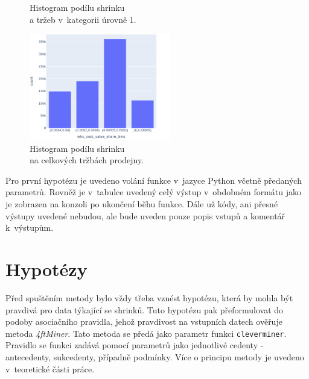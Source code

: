 \begin{figure}[h!]
\begin{minipage}[b]{.55\textwidth}
        \vspace*{-3em}
        \caption{Histogram podílu shrinku \\a tržeb v~kategorii úrovně 1.}
        \label{obr:nb:hist4}
    \end{minipage}     
       \vspace*{-1em}
\end{figure}

\begin{figure}[h!]
        \centering
        \captionsetup{justification=centering}
        \includegraphics[width=0.55\textwidth]{obrazky/grafy/histogram/newplot(4).png}
        \caption{Histogram podílu shrinku \\na celkových tržbách prodejny.}
        \label{obr:nb:hist5}
        \vspace*{-1em}
\end{figure}

Pro první hypotézu je uvedeno volání funkce v~jazyce Python včetně předaných parametrů. Rovněž je v~tabulce uvedený celý výstup v~obdobném formátu jako je zobrazen na konzoli po ukončení běhu funkce. Dále už kódy, ani přesné výstupy uvedené nebudou, ale bude uveden pouze popis vstupů a komentář k~výstupům. 

\section{Hypotézy}
\label{sec:hypo}
Před spuštěním metody bylo vždy třeba vznést hypotézu, která by mohla být pravdivá pro data týkající se shrinků. Tuto hypotézu pak přeformulovat do podoby asociačního pravidla, jehož pravdivost  na vstupních datech ověřuje metoda \emph{4ftMiner}. Tato metoda se předá jako parametr funkci \texttt{cleverminer}. Pravidlo se funkci zadává pomocí parametrů jako jednotlivé cedenty - antecedenty, sukcedenty, případně podmínky. Více o principu metody je uvedeno v~teoretické části práce.

\vspace*{1em}

